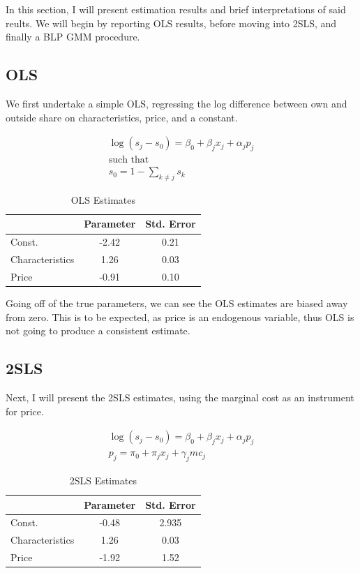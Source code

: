 \documentclass[11pt]{article}
\theoremstyle{definition}
\theoremstyle{remark}
\begin{document}
In this section, I will present estimation results and brief interpretations of said reults. We will
begin by reporting OLS results, before moving into 2SLS, and finally a BLP GMM procedure.

\subsection{OLS}

We first undertake a simple OLS, regressing the log difference between own and outside share on characteristics, price, and a constant.

\begin{gather*}
  \log{(s_j - s_0)} = \beta_0 + \beta_jx_j + \alpha_jp_j \\
  \text{such that} \\
  s_0 = 1 - \sum_{k\ne j}s_k
\end{gather*}

\begin{table}
\centering
\begin{tabular}{lcc}
\toprule
  & Parameter & Std. Error \\
\midrule
  Const. & -2.42 & 0.21 \\
  Characteristics & 1.26 & 0.03 \\
  Price & -0.91 & 0.10 \\
\bottomrule
\end{tabular}
\caption{OLS Estimates}
\end{table}

Going off of the true parameters, we can see the OLS estimates are biased away from zero.
This is to be expected, as price is an endogenous variable, thus OLS is not going to produce
a consistent estimate.

\subsection{2SLS}

Next, I will present the 2SLS estimates, using the marginal cost as an instrument for price.

\begin{gather*}
  \log{(s_j - s_0)} = \beta_0 + \beta_jx_j + \alpha_jp_j \\
  p_j = \pi_0 + \pi_jx_j + \gamma_jmc_j
\end{gather*}

\begin{table}
\centering
\begin{tabular}{lcc}
\toprule
  & Parameter & Std. Error \\
\midrule
  Const. & -0.48 & 2.935 \\
  Characteristics & 1.26 & 0.03 \\
  Price & -1.92 & 1.52 \\
\bottomrule
\end{tabular}
\caption{2SLS Estimates}
\end{table}
\end{document}

